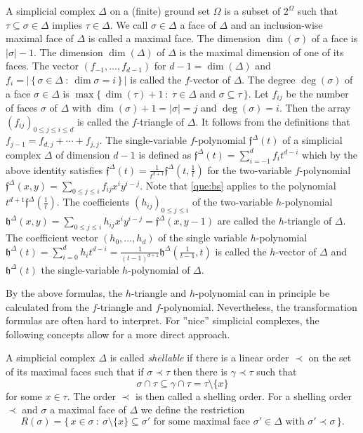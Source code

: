 \documentclass[11pt]{amsart}
\def\ff{\mathfrak{f}}
\def\fh{\mathfrak{h}}
\theoremstyle{plain}
\numberwithin{lemma}{\DefaultNumberTheoremWithin}
\numberwithin{theorem}{\DefaultNumberTheoremWithin}
\numberwithin{corollary}{\DefaultNumberTheoremWithin}
\numberwithin{proposition}{\DefaultNumberTheoremWithin}
\numberwithin{conjecture}{\DefaultNumberTheoremWithin}
\theoremstyle{definition}
\numberwithin{definition}{\DefaultNumberTheoremWithin}
\numberwithin{question}{\DefaultNumberTheoremWithin}
\numberwithin{problem}{\DefaultNumberTheoremWithin}
\theoremstyle{remark}
\numberwithin{remark}{\DefaultNumberTheoremWithin}
\numberwithin{example}{\DefaultNumberTheoremWithin}
\numberwithin{claim}{\DefaultNumberTheoremWithin}
\begin{document}
A simplicial complex $\Delta$ on a (finite) ground set $\Omega$ is a
subset of $2^\Omega$ such that $\tau \subseteq \sigma \in \Delta$ implies $\tau \in \Delta$.
We call $\sigma
\in  \Delta$ a face of $\Delta$ and an inclusion-wise maximal face of $\Delta$ is called a maximal face. The dimension $\dim (\sigma)$ of a face is 
$|\sigma| -1$. The dimension 
$\dim(\Delta)$ of $\Delta$ is the maximal dimension of one of its faces. 
The vector $(f_{-1},\ldots, f_{d-1})$ for
$d-1 = \dim (\Delta)$ and $f_i = \big|\,\{
\,\sigma \in \Delta~:~\dim \sigma = i\,\}\,\big|$ is 
called the $f$-vector of $\Delta$. 
The degree $\deg(\sigma)$ of a face
$\sigma \in \Delta$ is 
$\max \{\, \dim(\tau)+1~:~
\tau \in \Delta \text{ and } \sigma \subseteq \tau\,\}$. 
Let $f_{ij}$ be the number of faces
$\sigma$ of $\Delta$ with $\dim(\sigma) +1 
= |\sigma| = j$ and $\deg(\sigma) = i$.
Then the array $(f_{ij})_{0 \leq j \leq i \leq d}$
is called the $f$-triangle of $\Delta$.
It follows from the
definitions that 
$f_{j-1} = f_{d,j} + \cdots + f_{j,j}$.
The single-variable $f$-polynomial $\ff^\Delta(t)$ of a simplicial complex $\Delta$ 
of dimension $d-1$ is
defined as $\ff^ \Delta(t) = \sum_{i=-1}^{d} f_{i}t^ {d-i}$
which by the above identity satisfies
$\ff^ \Delta(t) = \frac{1}{t^{d+1}} \ff^\Delta(t,\frac{1}{t})$
for the two-variable $f$-polynomial $\ff^ \Delta(x,y)= \sum_{0 \leq j \leq i} f_{ij}x^ iy^{i-j}$.
Note that \ref{que:bs} applies to the polynomial $t^{d+1} \ff^\Delta(\frac{1}{t})$. 
The coefficients $(h_{ij})_{0 \leq j \leq i}$ of the two-variable $h$-polynomial
$\fh^\Delta(x,y) = \sum_{0 \leq j \leq i} h_{ij} x^iy^ {i-j} = \ff^ \Delta(x,y-1)$
are called the $h$-triangle of $\Delta$.
The coefficient vector $(h_0,\ldots, h_d)$ of the single variable $h$-polynomial 
$\fh^ \Delta(t) = \sum_{i=0}^ d h_it^{d-i} = \frac{1}{(t-1)^ {d+1}}\fh^ \Delta(\frac{1}{t-1},t)$
is called the $h$-vector of $\Delta$ and $\fh^\Delta(t)$ the single-variable $h$-polynomial
of $\Delta$.


By the above formulas, the $h$-triangle and $h$-polynomial can in principle be
calculated from the $f$-triangle and $f$-polynomial. Nevertheless, the 
transformation formulas are often hard to interpret. For ''nice'' simplicial 
complexes, the following concepts
allow for a more direct approach.

   A simplicial complex $\Delta$ is called {\it shellable} if there is a linear
  order $\prec$ on the set of its maximal faces such that 
  if $\sigma \prec \tau$ then there is $\gamma \prec \tau$ such that
  $$\sigma \cap \tau \subseteq \gamma \cap \tau = \tau \setminus \{x\}$$
  for some $x \in \tau$. The order $\prec$ is then called a shelling order.
For a shelling order $\prec$ and $\sigma$ a maximal face of $\Delta$ we define the
restriction 
  \[
R(\sigma) = \big\{\,x \in \sigma ~:~ \sigma \setminus\{x\} \subseteq \sigma' \text{ for some maximal face } \sigma' \in \Delta \text{ with } \sigma' \prec \sigma\,\big\}.
\]
\end{document}
